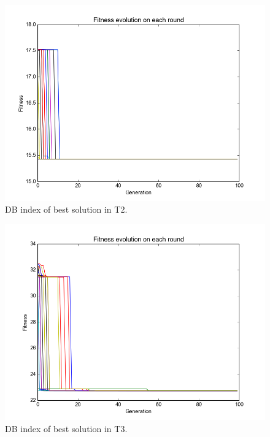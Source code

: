 \documentclass[12pt,a4paper,final]{article}
\begin{document}
\begin{figure}[hbtp]
\centering
\includegraphics[scale=0.6]{bi_nofactor_evo.png}
\caption{DB index of best solution in T2.}
\label{fig:best_evo}
\end{figure}

\begin{figure}[hbtp]
\centering
\includegraphics[scale=0.6]{sex_evo.png}
\caption{DB index of best solution in T3.}
\label{fig:best6_evo}
\end{figure}
\end{document}

